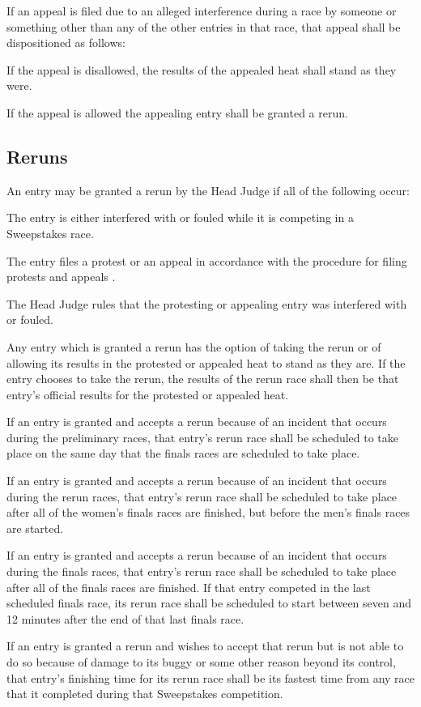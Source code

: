 \documentclass[openany]{book}
\begin{document}
If an appeal is filed due to an alleged interference during a race by someone or something other than any of the other entries in that race, that appeal shall be dispositioned as follows:

If the appeal is disallowed, the results of the appealed heat shall stand as they were.

If the appeal is allowed the appealing entry shall be granted a rerun.

\subsection{Reruns}

An entry may be granted a rerun by the Head Judge if all of the following occur:

The entry is either interfered with or fouled while it is competing in a Sweepstakes race.

The entry files a protest or an appeal in accordance with the procedure for filing protests and appeals .

The Head Judge rules that the protesting or appealing entry was interfered with or fouled.

Any entry which is granted a rerun has the option of taking the rerun or of allowing its results in the protested or appealed heat to stand as they are. If the entry chooses to take the rerun, the results of the rerun race shall then be that entry's official results for the protested or appealed heat.

If an entry is granted and accepts a rerun because of an incident that occurs during the preliminary races, that entry's rerun race shall be scheduled to take place on the same day that the finals races are scheduled to take place.

If an entry is granted and accepts a rerun because of an incident that occurs during the rerun races, that entry's rerun race shall be scheduled to take place after all of the women's finals races are finished, but before the men's finals races are started.

If an entry is granted and accepts a rerun because of an incident that occurs during the finals races, that entry's rerun race shall be scheduled to take place after all of the finals races are finished. If that entry competed in the last scheduled finals race, its rerun race shall be scheduled to start between seven and 12 minutes after the end of that last finals race.

If an entry is granted a rerun and wishes to accept that rerun but is not able to do so because of damage to its buggy or some other reason beyond its control, that entry's finishing time for its rerun race shall be its fastest time from any race that it completed during that Sweepstakes competition.
\end{document}
